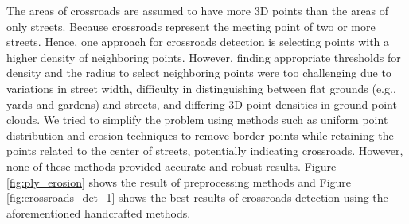\documentclass[11pt]{article}
\begin{document}
    The areas of crossroads are assumed to have more 3D points than the areas of only streets. Because crossroads represent
    the meeting point of two or more streets. Hence, one approach for crossroads detection is selecting points with
    a higher density of neighboring points. However, finding appropriate thresholds for density and the radius to
    select neighboring points were too challenging due to variations in street width, difficulty in distinguishing
    between flat grounds (e.g., yards and gardens) and streets, and differing 3D point densities in ground point
    clouds. We tried to simplify the problem using methods such as uniform point distribution and erosion techniques
    to remove border points while retaining the points related to the center of streets, potentially indicating
    crossroads. However, none of these methods provided accurate and robust results. Figure \ref{fig:ply_erosion} shows the
    result of preprocessing methods and Figure \ref{fig:crossroads_det_1} shows the best results of crossroads detection using
    the aforementioned handcrafted methods.
\end{document}
